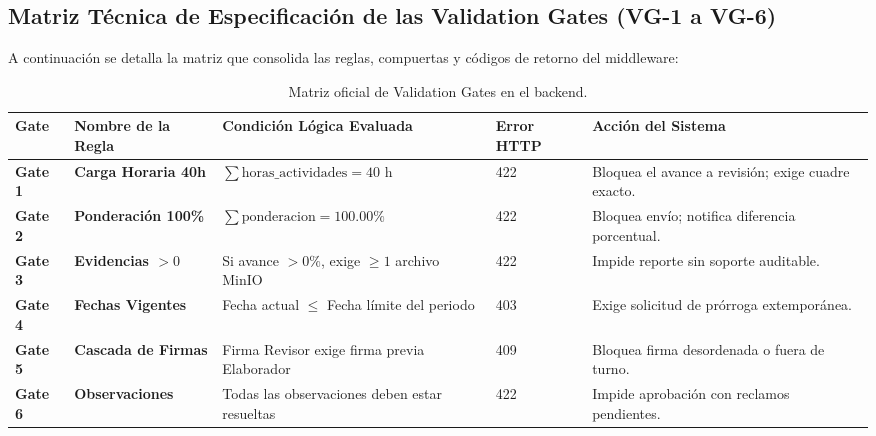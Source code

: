 \documentclass[12pt,a4paper]{article}
\begin{document}
\subsection{Matriz Técnica de Especificación de las Validation Gates (VG-1 a VG-6)}
A continuación se detalla la matriz que consolida las reglas, compuertas y códigos de retorno del middleware:
\begin{table}[H]
\centering
\small
\renewcommand{\arraystretch}{1.2}
\begin{tabularx}{\textwidth}{|>{\hsize=0.4\hsize\centering\arraybackslash\footnotesize}X|>{\hsize=0.8\hsize\raggedright\arraybackslash\bfseries\footnotesize}X|>{\hsize=1.2\hsize\raggedright\arraybackslash\footnotesize}X|>{\hsize=0.4\hsize\centering\arraybackslash\footnotesize}X|>{\hsize=1.2\hsize\raggedright\arraybackslash\footnotesize}X|}
\hline
\rowcolor{tableheader}
\textbf{Gate} & \textbf{Nombre de la Regla} & \textbf{Condición Lógica Evaluada} & \textbf{Error HTTP} & \textbf{Acción del Sistema} \\
\hline
\textbf{Gate 1} & Carga Horaria 40h & $\sum \text{horas\_actividades} = 40\text{ h}$ & 422 & Bloquea el avance a revisión; exige cuadre exacto. \\
\hline
\textbf{Gate 2} & Ponderación 100\% & $\sum \text{ponderacion} = 100.00\%$ & 422 & Bloquea envío; notifica diferencia porcentual. \\
\hline
\textbf{Gate 3} & Evidencias $>0$ & Si avance $>0\%$, exige $\ge 1$ archivo MinIO & 422 & Impide reporte sin soporte auditable. \\
\hline
\textbf{Gate 4} & Fechas Vigentes & Fecha actual $\le$ Fecha límite del periodo & 403 & Exige solicitud de prórroga extemporánea. \\
\hline
\textbf{Gate 5} & Cascada de Firmas & Firma Revisor exige firma previa Elaborador & 409 & Bloquea firma desordenada o fuera de turno. \\
\hline
\textbf{Gate 6} & Observaciones & Todas las observaciones deben estar resueltas & 422 & Impide aprobación con reclamos pendientes. \\
\hline
\end{tabularx}
\caption{Matriz oficial de Validation Gates en el backend.}
\label{tab:validation_gates_matrix}
\end{table}
\end{document}
